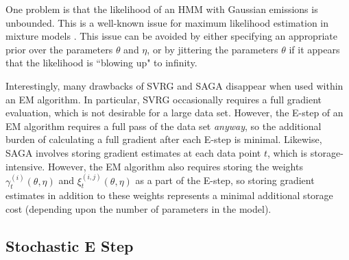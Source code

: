One problem is that the likelihood of an HMM with Gaussian emissions is unbounded. This is a well-known issue for maximum likelihood estimation in mixture models \citep{Chen:2009,Liu:2015b}. This issue can be avoided by either specifying an appropriate prior over the parameters $\theta$ and $\eta$, or by jittering the parameters $\theta$ if it appears that the likelihood is ``blowing up" to infinity.

Interestingly, many drawbacks of SVRG and SAGA disappear when used within an EM algorithm. In particular, SVRG occasionally requires a full gradient evaluation, which is not desirable for a large data set. However, the E-step of an EM algorithm requires a full pass of the data set \textit{anyway}, so the additional burden of calculating a full gradient after each E-step is minimal. Likewise, SAGA involves storing gradient estimates at each data point $t$, which is storage-intensive. However, the EM algorithm also requires storing the weights $\gamma_t^{(i)}(\theta, \eta)$ and $\xi_t^{(i,j)}(\theta, \eta)$ as a part of the E-step, so storing gradient estimates in addition to these weights represents a minimal additional storage cost (depending upon the number of parameters in the model).



\subsection{Stochastic E Step}
\label{subsec:stoch_E}

